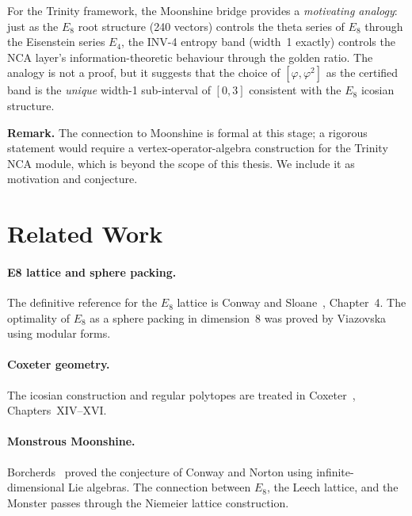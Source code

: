 For the Trinity framework, the Moonshine bridge provides a
\emph{motivating analogy}: just as the \(E_8\) root structure (240
vectors) controls the theta series of \(E_8\) through the Eisenstein
series \(E_4\), the INV-4 entropy band (width~1 exactly) controls
the NCA layer's information-theoretic behaviour through the golden
ratio.  The analogy is not a proof, but it suggests that the choice
of \([\varphi, \varphi^2]\) as the certified band is the
\emph{unique} width-1 sub-interval of \([0, 3]\) consistent with the
\(E_8\) icosian structure.

\medskip
\noindent
\textbf{Remark.}  The connection to Moonshine is formal at this
stage; a rigorous statement would require a vertex-operator-algebra
construction for the Trinity NCA module, which is beyond the scope of
this thesis.  We include it as motivation and conjecture.

\section{Related Work}
\label{sec:e8-related}

\paragraph{E8 lattice and sphere packing.}
The definitive reference for the \(E_8\) lattice is Conway and
Sloane~\cite{conway_sphere_packings}, Chapter~4.  The optimality of
\(E_8\) as a sphere packing in dimension~8 was proved by
Viazovska~\cite{viazovska2017sphere} using modular forms.

\paragraph{Coxeter geometry.}
The icosian construction and regular polytopes are treated
in Coxeter~\cite{coxeter_regular_polytopes}, Chapters~XIV–XVI.

\paragraph{Monstrous Moonshine.}
Borcherds~\cite{borcherds1992monstrous_moonshine} proved the
conjecture of Conway and Norton using infinite-dimensional Lie algebras.
The connection between \(E_8\), the Leech lattice, and the Monster
passes through the Niemeier lattice construction.

